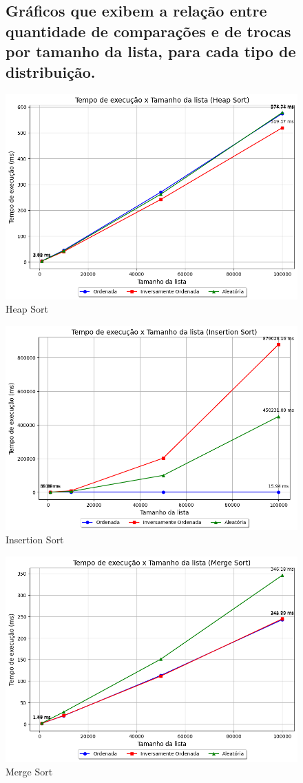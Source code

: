\documentclass[tcc1,project]{uftex}
\begin{document}
\setcounter{figure}{0} %

\begin{figure}[!h]
    \centering
    
    \subsection{Gráficos que exibem a relação entre quantidade de comparações e de trocas por tamanho da lista, para cada tipo de distribuição.}
    
    \includegraphics[width=0.5\linewidth]{graficos-tempo/grafico_Heap Sort.png}
    \caption{Heap Sort}
    \label{fig:heap-sort-tempo}
\end{figure}

\begin{figure}[!h]
    \centering
    \includegraphics[width=0.5\linewidth]{graficos-tempo/grafico_Insertion Sort.png}
    \caption{Insertion Sort}
    \label{fig:insertion-sort-tempo}
\end{figure}

\begin{figure}[!h]
    \centering
    \includegraphics[width=0.5\linewidth]{graficos-tempo/grafico_Merge Sort.png}
    \caption{Merge Sort}
    \label{fig:merge-sort-tempo}
\end{figure}
\end{document}
